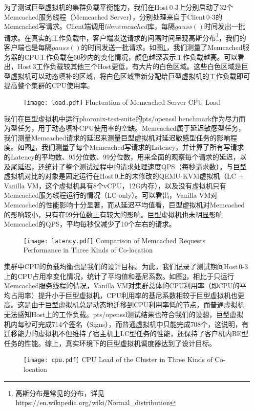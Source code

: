 为了测试巨型虚拟机的集群负载平衡能力，我们在Host\,0-3上分别启动了32个Memcached\cite{memcached}服务线程（Memcached Server），分别处理来自于Client\,0-3的Memcached写请求。Client端调用$libmemcached$库，每隔$gauss()$时间发出一批请求。在真实的工作负载中，客户端发送请求的间隔时间呈现高斯分布\footnote{高斯分布是常见的分布，详见https://en.wikipedia.org/wiki/Normal\_distribution}，我们的客户端也是每隔$gauss()$的时间发送一批请求。如图\ref{fig:load}，我们测量了Memcached服务器的CPU工作负载在60秒内的变化情况，颜色越深表示工作负载越高。可以看出，Host\,3工作负载较其他三个Host更低，有大片的白色区域。这些白色区域是巨型虚拟机可以动态填补的区域，将白色区域重新分配给巨型虚拟机的工作负载即可提高整个集群的CPU使用率。

\begin{figure}[!htp]
  \centering
  \texttt{[image: load.pdf]}
    {Fluctuation of Memcached Server CPU Load}
  \label{fig:load}
\end{figure}

我们在巨型虚拟机中运行phoronix-test-suite\cite{phoronix}的pts/openssl benchmark作为尽力而为型任务，用于动态填补CPU使用率的空缺。Memcached属于延迟敏感型任务，我们测量Memcached请求的延迟来测量巨型虚拟机对延迟敏感型任务的影响程度。如图\ref{fig:latency}，我们测量了每个Memcached写请求的Latency，并计算了所有写请求的Latency的平均数、95分位数、99分位数，用来全面的观察每个请求的延迟，以及尾延迟，还统计了整个测试过程中的请求处理速度QPS（每秒请求数）。与巨型虚拟机对比的对象是固定运行在Host\,0上的未修改的QEMU-KVM虚拟机（LC + Vanilla VM，这个虚拟机具有8个vCPU，12G内存），以及没有虚拟机只有Memcached服务线程运行的情况（LC only）。可以看出，Vanilla VM对Memcached的性能影响十分显著，而从延迟平均值看，巨型虚拟机对Memcached的影响较小，只有在99分位数上有较大的影响。巨型虚拟机也未明显影响Memcached的QPS，平均每秒仅减少了10个左右的请求。

\begin{figure}[!htp]
  \centering
  \texttt{[image: latency.pdf]}
    {Comparison of Memcached Requests Performance in Three Kinds of Co-location}
  \label{fig:latency}
\end{figure}

集群中CPU的负载均衡也是我们的设计目标。为此，我们记录了测试期间Host\,0-3上的CPU占用率变化情况，统计了平均值和基尼系数。如图\ref{fig:cpuload}，相比于只运行Memcached服务线程的情况，Vanilla VM对集群总体的CPU利用率（即CPU的平均占用率）提升小于巨型虚拟机，CPU利用率的基尼系数相较于巨型虚拟机也更高。这是由于巨型虚拟机总是动态地迁移到CPU利用率低的节点，而普通虚拟机无法感知Host上的工作负载。pts/openssl测试结果也符合我们的设想，巨型虚拟机内每秒可完成714个签名（Signs），而普通虚拟机中只能完成708个，这说明，有迁移能力的虚拟机不但维持了宿主机上LC型任务的性能，还保持了客户机内BE型任务的性能。综上，真实环境下的巨型虚拟机调度器达到了设计目标。
\begin{figure}[!htp]
  \centering
  \texttt{[image: cpu.pdf]}
    {CPU Load of the Cluster in Three Kinds of Co-location}
  \label{fig:cpuload}
\end{figure}

